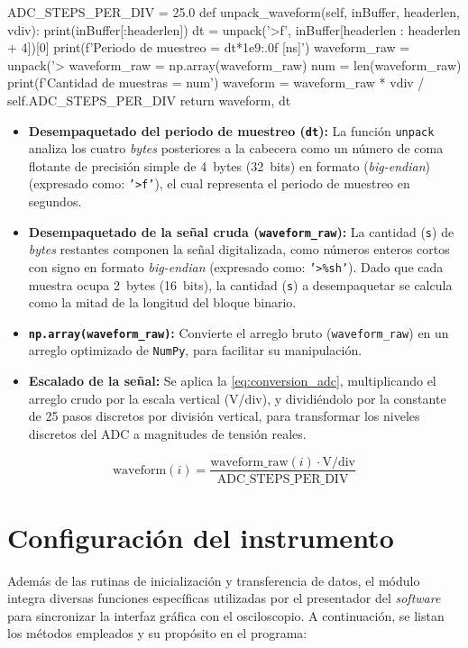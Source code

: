\begin{python}
ADC_STEPS_PER_DIV = 25.0
def unpack_waveform(self, inBuffer, headerlen, vdiv):
    print(inBuffer[:headerlen])
    dt = unpack('>f', inBuffer[headerlen : headerlen + 4])[0]
    print(f'Periodo de muestreo = {dt*1e9:.0f} [ns]')
    waveform_raw = unpack('>%
    waveform_raw = np.array(waveform_raw)
    num = len(waveform_raw)
    print(f'Cantidad de muestras = {num}')
    waveform = waveform_raw * vdiv / self.ADC_STEPS_PER_DIV
    return waveform, dt
\end{python}

\begin{itemize}
    \item \textbf{Desempaquetado del periodo de muestreo (\texttt{dt}):} La función \texttt{unpack} analiza los cuatro \textit{bytes} posteriores a la cabecera como un número de coma flotante de precisión simple de \SI{4}{bytes} (\SI{32}{bits}) en formato (\textit{big-endian}) (expresado como: \texttt{'>f'}), el cual representa el periodo de muestreo en segundos.
    \item \textbf{Desempaquetado de la señal cruda (\texttt{waveform\_raw}):} La cantidad (\texttt{s}) de \textit{bytes} restantes componen la señal digitalizada, como números enteros cortos con signo en formato \textit{big-endian} (expresado como: \texttt{'>\%sh'}). Dado que cada muestra ocupa \SI{2}{bytes} (\SI{16}{bits}), la cantidad (\texttt{s}) a desempaquetar se calcula como la mitad de la longitud del bloque binario.
    \item \textbf{\texttt{np.array(waveform\_raw)}:} Convierte el arreglo bruto (\texttt{waveform\_raw}) en un arreglo optimizado de \texttt{NumPy}, para facilitar su manipulación.
    \item \textbf{Escalado de la señal:} Se aplica la \autoref{eq:conversion_adc}, multiplicando el arreglo crudo por la escala vertical (V/div), y dividiéndolo por la constante de \SI{25}{} pasos discretos por división vertical, para transformar los niveles discretos del ADC a magnitudes de tensión reales.
\end{itemize}

\begin{equation}
    \text{waveform}(i) = \frac{\text{waveform\_raw}(i) \cdot {\text{V/div}}}{\text{ADC\_STEPS\_PER\_DIV}}
    \label{eq:conversion_adc}
\end{equation}

\section{Configuración del instrumento} \label{sec:configuracion_instrumento}
Además de las rutinas de inicialización y transferencia de datos, el módulo integra diversas funciones específicas utilizadas por el presentador del \textit{software} para sincronizar la interfaz gráfica con el osciloscopio. A continuación, se listan los métodos empleados y su propósito en el programa:

